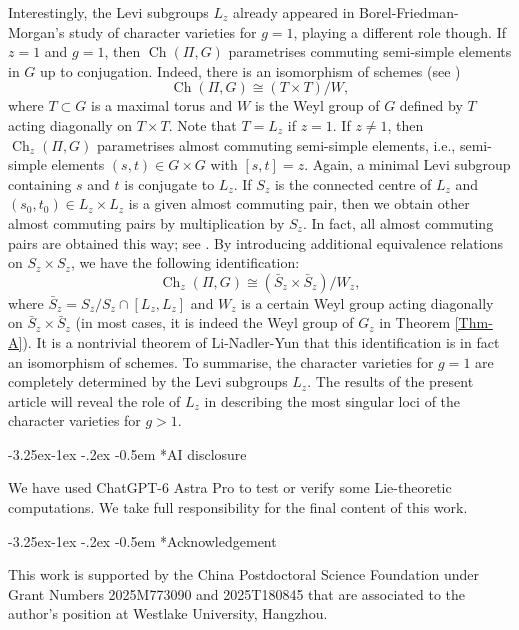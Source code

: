 \documentclass[11pt,oneside,dvipsnames]{amsart}
\makeatletter
\renewcommand\subsection{\@startsection{subsection}{3}{\z@}%
                                     {-3.25ex\@plus -1ex \@minus -.2ex}%
                                     {-0.5em}%
                                     {\normalfont\normalsize\bfseries}}
\theoremstyle{plain}
\theoremstyle{definition}
\theoremstyle{named}
\DeclareMathOperator{\Ch}{Ch}
\makeatother
\begin{document}
Interestingly, the Levi subgroups $L_z$ already appeared in Borel-Friedman-Morgan's study of character varieties for $g=1$, playing a different role though. If $z=1$ and $g=1$, then $\Ch(\Pi,G)$ parametrises commuting semi-simple elements in $G$ up to conjugation. Indeed, there is an isomorphism of schemes (see \cite{LNY})
$$
\Ch(\Pi,G)\cong (T\times T)/W,
$$
where $T\subset G$ is a maximal torus and $W$ is the Weyl group of $G$ defined by $T$ acting diagonally on $T\times T$. Note that $T=L_z$ if $z=1$. If $z\ne 1$, then $\Ch_z(\Pi,G)$ parametrises almost commuting semi-simple elements, i.e., semi-simple elements $(s,t)\in G\times G$ with $[s,t]=z$. Again, a minimal Levi subgroup containing $s$ and $t$ is conjugate to $L_z$.  If $S_z$ is the connected centre of $L_z$ and $(s_0,t_0)\in L_z\times L_z$ is a given almost commuting pair, then we obtain other almost commuting pairs by multiplication by $S_z$. In fact, all almost commuting pairs are obtained this way; see \cite[Proposition 6.2.1]{LNY}. By introducing additional equivalence relations on $S_z\times S_z$, we have the following identification:
$$
\Ch_z(\Pi,G)\cong (\bar{S}_z\times\bar{S}_z)/W_z,
$$
where $\bar{S}_z=S_z/S_z\cap[L_z,L_z]$ and $W_z$ is a certain Weyl group acting diagonally on $\bar{S}_z\times\bar{S}_z$ (in most cases, it is indeed the Weyl group of $G_z$ in Theorem \ref{Thm-A}). It is a nontrivial theorem of Li-Nadler-Yun that this identification is in fact an isomorphism of schemes. To summarise, the character varieties for $g=1$ are completely determined by the Levi subgroups $L_z$. The results of the present article will reveal the role of $L_z$ in describing the most singular loci of the character varieties for $g>1$.

\subsection*{AI disclosure}\hfill

We have used ChatGPT-6 Astra Pro to test or verify some Lie-theoretic computations. We take full responsibility for the final content of this work.

\subsection*{Acknowledgement}\hfill

This work is supported by the China Postdoctoral Science Foundation under Grant Numbers 2025M773090 and 2025T180845 that are associated to the author's position at Westlake University, Hangzhou.
\end{document}

